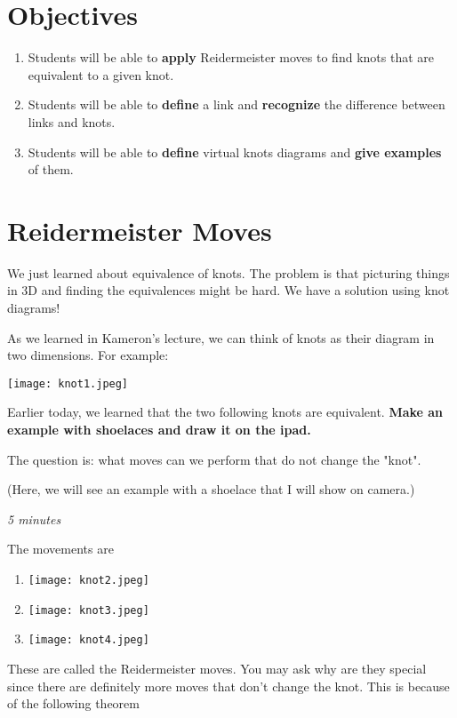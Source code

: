 \documentclass[12pt,letterpaper]{article}
\begin{document}
    \section*{Objectives}
    \begin{enumerate}
        \item Students will be able to \textbf{apply} Reidermeister moves to find knots that are equivalent to a given knot.
        \item Students will be able to \textbf{define} a link and \textbf{recognize} the difference between links and knots.
        \item Students will be able to \textbf{define} virtual knots diagrams and \textbf{give examples} of them.
    \end{enumerate}
	\section{Reidermeister Moves}
	    We just learned about equivalence of knots. The problem is that picturing things in 3D and finding the equivalences might be hard. We have a solution using knot diagrams!
	    
	    As we learned in Kameron's lecture, we can think of knots as their diagram in two dimensions. For example:
	    \begin{center}
	        \texttt{[image: knot1.jpeg]}
	    \end{center}
	    Earlier today, we learned that the two following knots are equivalent. 
	    \textbf{Make an example with shoelaces and draw it on the ipad.}
	    
	    The question is: what moves can we perform that do not change the "knot".
	    
	   
	    (Here, we will see an example with a shoelace that I will show on camera.)
	    
	    \textit{5 minutes}
	    
	    The movements are
	    \begin{enumerate}
	        \item \texttt{[image: knot2.jpeg]}
	        
	        \item \texttt{[image: knot3.jpeg]}
	        
	        \item \texttt{[image: knot4.jpeg]}
	    \end{enumerate}
	    
	    These are called the Reidermeister moves. You may ask why are they special since there are definitely more moves that don't change the knot. This is because of the following theorem
	  
\end{document}
